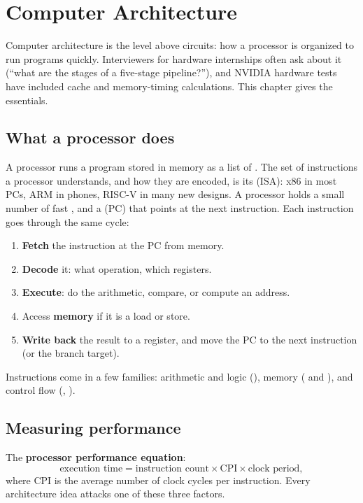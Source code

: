 \chapter{Computer Architecture}
\label{ch:arch}

Computer architecture is the level above circuits: how a processor is organized to run programs quickly. Interviewers for hardware internships often ask about it (``what are the stages of a five-stage pipeline?''), and NVIDIA hardware tests have included cache and memory-timing calculations. This chapter gives the essentials.

\section{What a processor does}

A processor runs a program stored in memory as a list of . The set of instructions a processor understands, and how they are encoded, is its  (ISA): x86 in most PCs, ARM in phones, RISC-V in many new designs. A processor holds a small number of fast , and a  (PC) that points at the next instruction. Each instruction goes through the same cycle:
\begin{enumerate}
  \item \textbf{Fetch} the instruction at the PC from memory.
  \item \textbf{Decode} it: what operation, which registers.
  \item \textbf{Execute}: do the arithmetic, compare, or compute an address.
  \item Access \textbf{memory} if it is a load or store.
  \item \textbf{Write back} the result to a register, and move the PC to the next instruction (or the branch target).
\end{enumerate}

Instructions come in a few families: arithmetic and logic (), memory ( and ), and control flow (, ).

\section{Measuring performance}

\begin{bigidea}
The \textbf{processor performance equation}:
\[
  \text{execution time} = \text{instruction count} \times \text{CPI} \times \text{clock period},
\]
where CPI is the average number of clock cycles per instruction. Every architecture idea attacks one of these three factors.
\end{bigidea}

